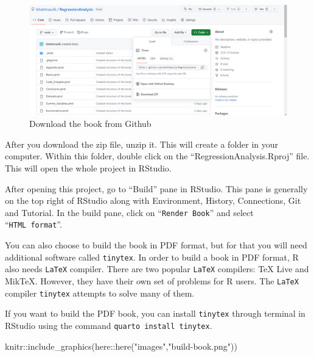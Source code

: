 \documentclass[
  letterpaper,
  paper =a4,
  twoside,
  openright,
  headsepline,
  footsepline,
  listof = totocnumbered,
  chapterprefix = true,
  firstiscover]{scrbook}
\newenvironment{Shaded}{\begin{snugshade}}{\end{snugshade}}
\newcommand{\FunctionTok}[1]{\textcolor[rgb]{0.28,0.35,0.67}{#1}}
\newcommand{\NormalTok}[1]{\textcolor[rgb]{0.00,0.23,0.31}{#1}}
\newcommand{\SpecialCharTok}[1]{\textcolor[rgb]{0.37,0.37,0.37}{#1}}
\newcommand{\StringTok}[1]{\textcolor[rgb]{0.13,0.47,0.30}{#1}}
\begin{document}
\begin{figure}[H]

{\centering \includegraphics[width=4.43in,height=\textheight]{images/download-book.png}

}

\caption{\label{fig-download-book}Download the book from Github}

\end{figure}

After you download the zip file, unzip it. This will create a folder in
your computer. Within this folder, double click on the
``RegressionAnalysis.Rproj'' file. This will open the whole project in
RStudio.

After opening this project, go to ``Build'' pane in RStudio. This pane
is generally on the top right of RStudio along with Environment,
History, Connections, Git and Tutorial. In the build pane, click on
``\texttt{Render\ Book}'' and select ``\texttt{HTML\ format}''.

You can also choose to build the book in PDF format, but for that you
will need additional software called \texttt{tinytex}. In order to build
a book in PDF format, R also needs \texttt{LaTeX} compiler. There are
two popular \texttt{LaTeX} compilers: TeX Live and MikTeX. However, they
have their own set of problems for R users. The \texttt{LaTeX} compiler
\texttt{tinytex} attempts to solve many of them.

If you want to build the PDF book, you can install \texttt{tinytex}
through terminal in RStudio using the command
\texttt{quarto\ install\ tinytex}.

\begin{Shaded}
\begin{Highlighting}[numbers=left,,]
\NormalTok{knitr}\SpecialCharTok{::}\FunctionTok{include\_graphics}\NormalTok{(here}\SpecialCharTok{::}\FunctionTok{here}\NormalTok{(}\StringTok{"images"}\NormalTok{,}\StringTok{"build{-}book.png"}\NormalTok{))}
\end{Highlighting}
\end{Shaded}
\end{document}
